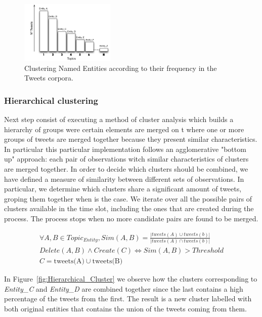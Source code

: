 \documentclass{sig-alternate}
\begin{document}
\begin{figure}[h!]
\centering
\includegraphics[width=0.4\textwidth]{figure/EntityCluster.png}
\caption{Clustering Named Entities according to their frequency in the Tweets corpora.}
\label{fig:EntityCluster}
\end{figure}

\subsubsection{Hierarchical clustering}

Next step consist of executing a method of cluster analysis which builds a hierarchy of groups were certain elements are merged on t where one or more groups of tweets are merged together because they present similar characteristics. In particular this particular implementation follows an agglomerative "bottom up" approach: each pair of observations witch similar characteristics of clusters are merged together. In order to decide which clusters should be combined, we have defined a measure of similarity between different sets of observations. In particular, we determine which clusters share a significant amount of tweets, groping them together when is the case. We iterate over all the possible pairs of clusters available in the time slot, including the ones that are created during the process. The process stops when no more candidate pairs are found to be merged. 

\begin{equation}
\begin{split}
\forall A, B \in Topic_{Entity}, Sim (A,B) =\frac{\left | tweets(A) \cup  tweets(b) \right |}{\left | tweets(A) \cap  tweets(b) \right |} \\
Delete(A, B) \wedge Create(C) \Leftrightarrow  Sim (A,B) > Threshold \\
C= \text{tweets(A)} \cup \text{tweets(B)}
\end{split}
\end{equation}


In Figure~\ref{fig:Hierarchical_Cluster} we observe how the clusters corresponding to \textit{Entity\_C} and \textit{Entity\_D} are combined together since the last contains a high percentage of the tweets from the first. The result is a new cluster labelled with both original entities that contains the union of the tweets coming from them.
\end{document}
